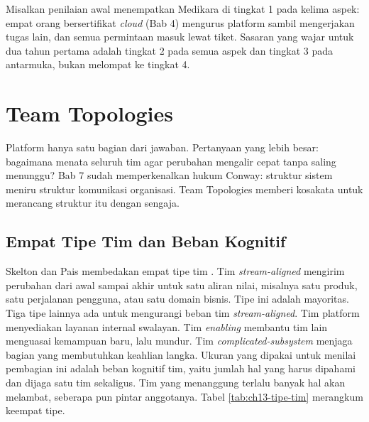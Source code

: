 Misalkan penilaian awal menempatkan Medikara di tingkat 1 pada kelima aspek: empat orang
bersertifikat \textit{cloud} (Bab 4) mengurus platform sambil mengerjakan tugas lain, dan semua
permintaan masuk lewat tiket. Sasaran yang wajar untuk dua tahun pertama adalah tingkat 2 pada
semua aspek dan tingkat 3 pada antarmuka, bukan melompat ke tingkat 4.

\section{Team Topologies}
\label{sec:ch13-topologi}

Platform hanya satu bagian dari jawaban. Pertanyaan yang lebih besar: bagaimana menata seluruh
tim agar perubahan mengalir cepat tanpa saling menunggu? Bab 7 sudah memperkenalkan hukum Conway:
struktur sistem meniru struktur komunikasi organisasi. Team Topologies memberi kosakata untuk
merancang struktur itu dengan sengaja.

\subsection{Empat Tipe Tim dan Beban Kognitif}

Skelton dan Pais membedakan empat tipe tim \cite{skelton2025}. Tim \textit{stream-aligned}
mengirim perubahan dari awal sampai akhir untuk satu aliran nilai, misalnya satu produk, satu
perjalanan pengguna, atau satu domain bisnis. Tipe ini adalah mayoritas. Tiga tipe lainnya ada
untuk mengurangi beban tim \textit{stream-aligned}. Tim platform menyediakan layanan internal
swalayan. Tim \textit{enabling} membantu tim lain menguasai kemampuan baru, lalu mundur. Tim
\textit{complicated-subsystem} menjaga bagian yang membutuhkan keahlian langka. Ukuran yang
dipakai untuk menilai pembagian ini adalah beban kognitif tim, yaitu jumlah hal yang harus
dipahami dan dijaga satu tim sekaligus. Tim yang menanggung terlalu banyak hal akan melambat,
seberapa pun pintar anggotanya. Tabel \ref{tab:ch13-tipe-tim} merangkum keempat tipe.

